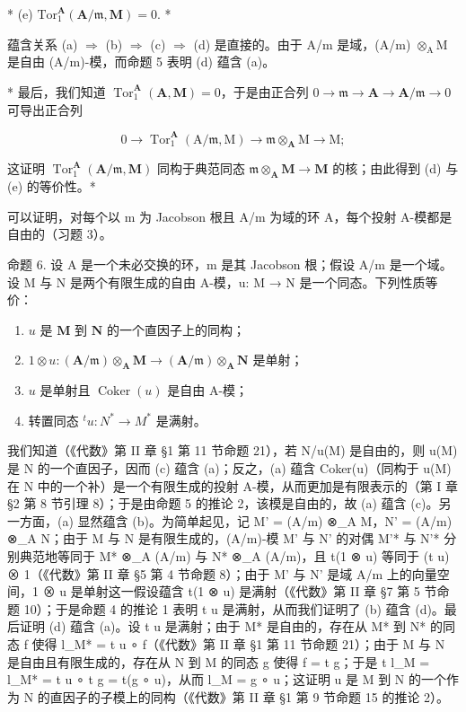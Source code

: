 * (e) \(\mathrm{Tor}_1^{\mathbf{A}}(\mathbf{A} / \mathfrak{m},\mathbf{M}) = 0.\) *

蕴含关系 (a) \(\Rightarrow\) (b) \(\Rightarrow\) (c) \(\Rightarrow\) (d) 是直接的。由于 A/m 是域，(A/m) \(\otimes_{\mathrm{A}} \mathrm{M}\) 是自由 (A/m)-模，而命题 5 表明 (d) 蕴含 (a)。

* 最后，我们知道 \(\operatorname{Tor}_1^{\mathbf{A}}(\mathbf{A},\mathbf{M}) = 0\)，于是由正合列 \(0\to \mathfrak{m}\to \mathbf{A}\to \mathbf{A} / \mathfrak{m}\to 0\) 可导出正合列

\[
0 \rightarrow \operatorname{Tor} _ {1} ^ {\mathbf {A}} (\mathrm{A} / \mathfrak {m}, \mathrm{M}) \rightarrow \mathfrak {m} \otimes_ {\mathbf {A}} \mathrm{M} \rightarrow \mathrm{M};
\]

这证明 \(\operatorname{Tor}_1^{\mathbf{A}}(\mathbf{A} / \mathfrak{m},\mathbf{M})\) 同构于典范同态 \(\mathfrak{m}\otimes_{\mathbf{A}}\mathbf{M}\to \mathbf{M}\) 的核；由此得到 (d) 与 (e) 的等价性。*

可以证明，对每个以 m 为 Jacobson 根且 A/m 为域的环 A，每个投射 A-模都是自由的（习题 3）。

命题 6. 设 A 是一个未必交换的环，m 是其 Jacobson 根；假设 A/m 是一个域。设 M 与 N 是两个有限生成的自由 A-模，u: M → N 是一个同态。下列性质等价：

\begin{enumerate}
\def\labelenumi{(\alph{enumi})}
\item
  \(u\) 是 \(\mathbf{M}\) 到 \(\mathbf{N}\) 的一个直因子上的同构；
\item
  \(1 \otimes u: (\mathbf{A} / \mathfrak{m}) \otimes_{\mathbf{A}} \mathbf{M} \to (\mathbf{A} / \mathfrak{m}) \otimes_{\mathbf{A}} \mathbf{N}\) 是单射；
\item
  \(u\) 是单射且 \(\operatorname{Coker}(u)\) 是自由 A-模；
\item
  转置同态 \(^{t}u: N^{*} \rightarrow M^{*}\) 是满射。
\end{enumerate}

我们知道（《代数》第 II 章 §1 第 11 节命题 21），若 N/u(M) 是自由的，则 u(M) 是 N 的一个直因子，因而 (c) 蕴含 (a)；反之，(a) 蕴含 Coker(u)（同构于 u(M) 在 N 中的一个补）是一个有限生成的投射 A-模，从而更加是有限表示的（第 I 章 §2 第 8 节引理 8）；于是由命题 5 的推论 2，该模是自由的，故 (a) 蕴含 (c)。另一方面，(a) 显然蕴含 (b)。为简单起见，记 M' = (A/m) ⊗\_A M，N' = (A/m) ⊗\_A N；由于 M 与 N 是有限生成的，(A/m)-模 M' 与 N' 的对偶 M'* 与 N'* 分别典范地等同于 M* ⊗\_A (A/m) 与 N* ⊗\_A (A/m)，且 t(1 ⊗ u) 等同于 (t u) ⊗ 1（《代数》第 II 章 §5 第 4 节命题 8）；由于 M' 与 N' 是域 A/m 上的向量空间，1 ⊗ u 是单射这一假设蕴含 t(1 ⊗ u) 是满射（《代数》第 II 章 §7 第 5 节命题 10）；于是命题 4 的推论 1 表明 t u 是满射，从而我们证明了 (b) 蕴含 (d)。最后证明 (d) 蕴含 (a)。设 t u 是满射；由于 M* 是自由的，存在从 M* 到 N* 的同态 f 使得 l\_M* = t u ∘ f（《代数》第 II 章 §1 第 11 节命题 21）；由于 M 与 N 是自由且有限生成的，存在从 N 到 M 的同态 g 使得 f = t g；于是 t l\_M = l\_M* = t u ∘ t g = t(g ∘ u)，从而 l\_M = g ∘ u；这证明 u 是 M 到 N 的一个作为 N 的直因子的子模上的同构（《代数》第 II 章 §1 第 9 节命题 15 的推论 2）。

